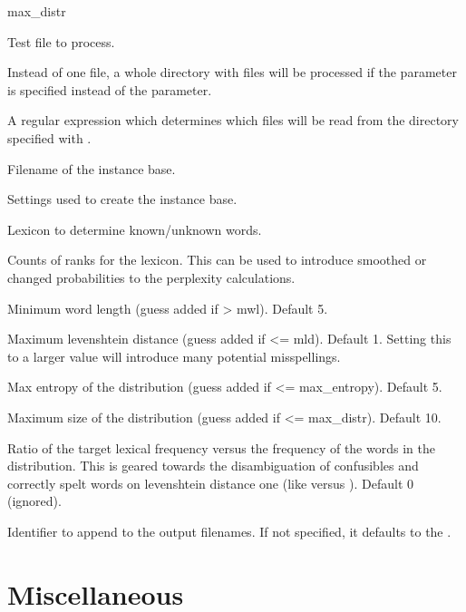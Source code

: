 \documentclass[a4paper,10pt,twoside]{report}
\begin{document}
\begin{varlist}{max\_distr}
\item[filename] Test file to process.
\item[dir] Instead of one file, a whole directory with files will be
  processed if the  parameter is specified instead of the
   parameter.
\item[dirmatch] A regular expression which determines which files will
  be read from the directory specified with .
\item[ibasefile] Filename of the instance base.
\item[timbl] Settings used to create the instance base.
\item[lexicon] Lexicon to determine known/unknown words.
\item[counts] Counts of ranks for the lexicon. This can be used to
  introduce smoothed or changed probabilities to the perplexity
  calculations. 
\item[mwl] Minimum word length (guess added if > mwl). Default 5.
\item[mld] Maximum levenshtein distance (guess added if <=
  mld). Default 1. Setting this to a larger value will introduce many
  potential misspellings.
\item[max\_ent] Max entropy of the distribution (guess added if <=
  max\_entropy). Default 5.
\item[max\_distr] Maximum size of the distribution (guess added if <=
  max\_distr). Default 10.
\item[min\_ratio] Ratio of the target lexical frequency versus the
  frequency of the words in the distribution. This is geared towards
  the disambiguation of confusibles and correctly spelt words on
  levenshtein distance one (like  versus
  ). Default 0 (ignored).
\item[id] Identifier to append to the output filenames. If not
  specified, it defaults to the \pid{}.
\end{varlist}


\section{Miscellaneous}

\subsection{}
\end{document}
